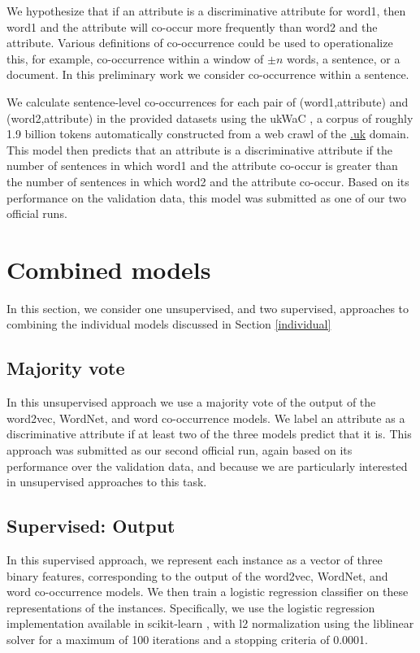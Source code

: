 \documentclass[11pt,a4paper]{article}
\begin{document}
We hypothesize that if an attribute is a discriminative attribute for
word1, then word1 and the attribute will co-occur more frequently than
word2 and the attribute. Various definitions of co-occurrence could be
used to operationalize this, for example, co-occurrence within a
window of $\pm n$ words, a sentence, or a document. In this
preliminary work we consider co-occurrence within a sentence.

We calculate sentence-level co-occurrences for each pair of
(word1,attribute) and (word2,attribute) in the provided datasets using
the ukWaC \citep{Ferraresi2008}, a corpus of roughly 1.9 billion
tokens automatically constructed from a web crawl of the \url{.uk}
domain. This model then predicts that an attribute is a discriminative
attribute if the number of sentences in which word1 and the attribute
co-occur is greater than the number of sentences in which word2 and
the attribute co-occur. Based on its performance on the validation
data, this model was submitted as one of our two official runs.

\section{Combined models\label{sec:combined}}

In this section, we consider one unsupervised, and two supervised,
approaches to combining the individual models discussed in Section
\ref{individual}

\subsection{Majority vote}

In this unsupervised approach we use a majority vote of the output of
the word2vec, WordNet, and word co-occurrence models. We label an
attribute as a discriminative attribute if at least two of the three
models predict that it is. This approach was submitted as our second
official run, again based on its performance over the validation data,
and because we are particularly interested in unsupervised approaches
to this task.

\subsection{Supervised: Output\label{sec:supervised:output}}

In this supervised approach, we represent each instance as a vector of
three binary features, corresponding to the output of the word2vec,
WordNet, and word co-occurrence models. We then train a logistic
regression classifier on these representations of the
instances. Specifically, we use the logistic regression implementation
available in scikit-learn \citep{scikit-learn}, with l2 normalization
using the liblinear solver for a maximum of 100 iterations and a
stopping criteria of 0.0001.
\end{document}
